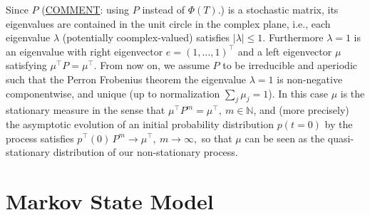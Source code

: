 \documentclass[aps, pre, preprint,unsortedaddress,a4paper,onecolumn]{revtex4}
\newcommand{\recheck}[1]{{\color{red} #1}}
\newcommand{\vect}[1]{#1}
\newcommand{\myphi}{\Phi}
\newcommand{\mymu}{\mu}
\begin{document}
Since \recheck{$P$} \recheck{(\underline{COMMENT}: using $P$ instead of $\myphi(T)$.)} is a stochastic matrix, its eigenvalues are contained in the unit circle in
the complex plane, i.e., each eigenvalue $\lambda$ (potentially coomplex-valued)
satisfies $|\lambda|\le 1$. Furthermore $\lambda=1$ is an
eigenvalue with \recheck{right} eigenvector $\vect e=(1,\ldots,1)^{\top}$ and a \recheck{left} eigenvector $\mymu$
satisfying
\recheck{$\mymu^{\top}P=\mymu^{\top}$.}
From now on, we assume $P$ to be irreducible and aperiodic such that the Perron Frobenius theorem the eigenvalue $\lambda=1$ is  non-negative componentwise, and unique (up to normalization $\sum_j\mu_j=1$). \recheck{In this case $\mymu$ is the stationary measure in the sense that
$
 \mymu^{\top} P^m = \mymu^{\top},\ m\in\mathbb N
$,
and (more precisely) the asymptotic evolution of an initial probability distribution $\vect p(t=0)$ by the process satisfies
$
\vect p^{\top}(0)\,P^m \to \mymu^{\top},\ m\to\infty,
$
so that $\mymu$ can be seen as the quasi-stationary distribution of our non-stationary process.}



\section{Markov State Model}
\label{sec:build-msm}
\end{document}
